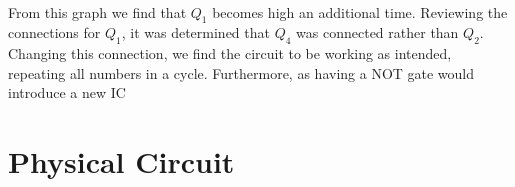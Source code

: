 \documentclass{article}
\begin{document}
\\
From this graph we find that $Q_1$ becomes high an additional time. Reviewing the connections for $Q_1$, it was determined
that $Q_4$ was connected rather than $Q_2$. Changing this connection, we find the circuit to be working as intended, repeating all 
numbers in a cycle. Furthermore, as having a NOT gate would introduce a new IC 
\newpage
\section{Physical Circuit}
\end{document}
